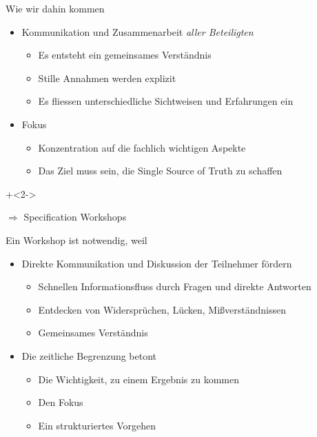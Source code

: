 \begin{frame}{Wie wir dahin kommen}

\begin{itemize}
	\item Kommunikation und Zusammenarbeit \em aller \em Beteiligten 
	\begin{itemize}
		\item Es entsteht ein gemeinsames Verständnis
		\item Stille Annahmen werden explizit
		\item Es fliessen unterschiedliche Sichtweisen und Erfahrungen ein
	\end{itemize}
	
	\item Fokus
	\begin{itemize}
		\item Konzentration auf die fachlich wichtigen Aspekte
		\item Das Ziel muss sein, die Single Source of Truth zu schaffen
	\end{itemize}
\end{itemize}

\onslide+<2->
	
$\Rightarrow$ Specification Workshops

\end{frame}


\begin{frame}{Ein Workshop ist notwendig, weil}

\begin{itemize}
	\item Direkte Kommunikation und Diskussion der Teilnehmer fördern
	\begin{itemize}
		\item Schnellen Informationsfluss durch Fragen und direkte Antworten
		\item Entdecken von Widersprüchen, Lücken, Mißverständnissen
		\item Gemeinsames Verständnis
	\end{itemize}

	\item Die zeitliche Begrenzung betont
	\begin{itemize}
		\item Die Wichtigkeit, zu einem Ergebnis zu kommen
		\item Den Fokus
		\item Ein strukturiertes Vorgehen
	\end{itemize}
\end{itemize}

\end{frame}


